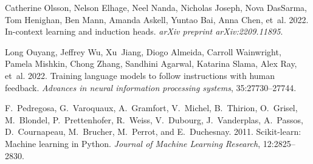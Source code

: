 \documentclass[11pt]{article}
\begin{document}
\begin{thebibliography}{88}
    Catherine Olsson, Nelson Elhage, Neel Nanda, Nicholas Joseph, Nova DasSarma, Tom Henighan, Ben Mann, Amanda Askell, Yuntao Bai, Anna Chen, et~al. 2022.
    \newblock In-context learning and induction heads.
    \newblock \emph{arXiv preprint arXiv:2209.11895}.
    
    Long Ouyang, Jeffrey Wu, Xu~Jiang, Diogo Almeida, Carroll Wainwright, Pamela Mishkin, Chong Zhang, Sandhini Agarwal, Katarina Slama, Alex Ray, et~al. 2022.
    \newblock Training language models to follow instructions with human feedback.
    \newblock \emph{Advances in neural information processing systems}, 35:27730--27744.
    
    F.~Pedregosa, G.~Varoquaux, A.~Gramfort, V.~Michel, B.~Thirion, O.~Grisel, M.~Blondel, P.~Prettenhofer, R.~Weiss, V.~Dubourg, J.~Vanderplas, A.~Passos, D.~Cournapeau, M.~Brucher, M.~Perrot, and E.~Duchesnay. 2011.
    \newblock Scikit-learn: Machine learning in {P}ython.
    \newblock \emph{Journal of Machine Learning Research}, 12:2825--2830.
    

\end{thebibliography}
\end{document}
